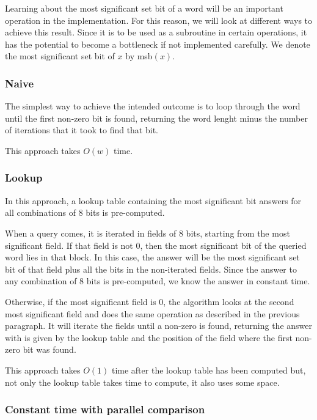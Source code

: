 Learning about the most significant set bit of a word will be an important operation in the implementation. For this reason, we will look at different ways to achieve this result. Since it is to be used as a subroutine in certain operations, it has the potential to become a bottleneck if not implemented carefully. We denote the most significant set bit of $x$ by msb$(x)$.

\subsubsection{Naive}

The simplest way to achieve the intended outcome is to loop through the word until the first non-zero bit is found, returning the word lenght minus the number of iterations that it took to find that bit.

This approach takes $O(w)$ time.

\subsubsection{Lookup}

In this approach, a lookup table containing the most significant bit answers for all combinations of 8 bits is pre-computed.

When a query comes, it is iterated in fields of 8 bits, starting from the most significant field. If that field is not $0$, then the most significant bit of the queried word lies in that block. In this case, the answer will be the most significant set bit of that field plus all the bits in the non-iterated fields. Since the answer to any combination of 8 bits is pre-computed, we know the answer in constant time.

Otherwise, if the most significant field is $0$, the algorithm looks at the second most significant field and does the same operation as described in the previous paragraph. It will iterate the fields until a non-zero is found, returning the answer with is given by the lookup table and the position of the field where the first non-zero bit was found.

This approach takes $O(1)$ time after the lookup table has been computed but, not only the lookup table takes time to compute, it also uses some space.

\subsubsection{Constant time with parallel comparison} \label{sec:msbO1}

